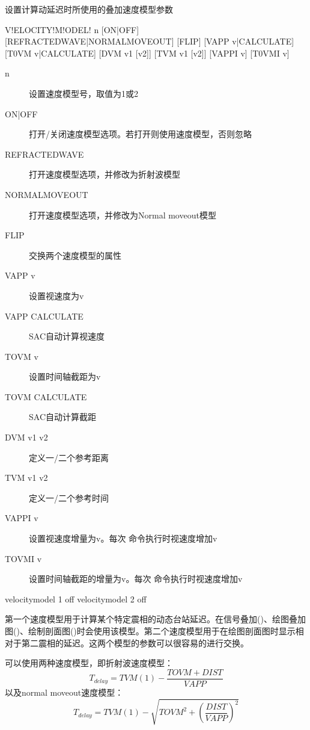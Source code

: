 \label{sss:velocitymodel}

设置计算动延迟时所使用的叠加速度模型参数

\begin{SACSTX}
V!ELOCITY!M!ODEL! n [ON|OFF] [REFRACTEDWAVE|NORMALMOVEOUT] [FLIP] [VAPP v|CALCULATE]
    [T0VM v|CALCULATE] [DVM v1 [v2]] [TVM v1 [v2]] [VAPPI v] [T0VMI v]
\end{SACSTX}

\begin{description}
\item [n] 设置速度模型号，取值为1或2
\item [ON|OFF] 打开/关闭速度模型选项。若打开则使用速度模型，否则忽略
\item [REFRACTEDWAVE] 打开速度模型选项，并修改为折射波模型
\item [NORMALMOVEOUT] 打开速度模型选项，并修改为Normal moveout模型
\item [FLIP] 交换两个速度模型的属性
\item [VAPP v] 设置视速度为v
\item [VAPP CALCULATE] SAC自动计算视速度
\item [TOVM v] 设置时间轴截距为v
\item [TOVM CALCULATE] SAC自动计算截距
\item [DVM v1 v2] 定义一/二个参考距离
\item [TVM v1 v2] 定义一/二个参考时间
\item [VAPPI v] 设置视速度增量为v。每次  命令执行时视速度增加v
\item [TOVMI v] 设置时间轴截距的增量为v。每次  命令执行时视速度增加v
\end{description}

\begin{SACDFT}
velocitymodel 1 off
velocitymodel 2 off
\end{SACDFT}

第一个速度模型用于计算某个特定震相的动态台站延迟。在信号叠加()、绘图叠加图()、绘制剖面图()时会使用该模型。第二个速度模型用于在绘图剖面图时显示相对于第二震相的延迟。这两个模型的参数可以很容易的进行交换。

可以使用两种速度模型，即折射波速度模型：
\[ T_{delay} = TVM(1) - \frac{TOVM+DIST}{VAPP} \]
以及normal moveout速度模型：
\[ T_{delay} = TVM(1) - \sqrt{TOVM^2 + (\frac{DIST}{VAPP})^2} \]

